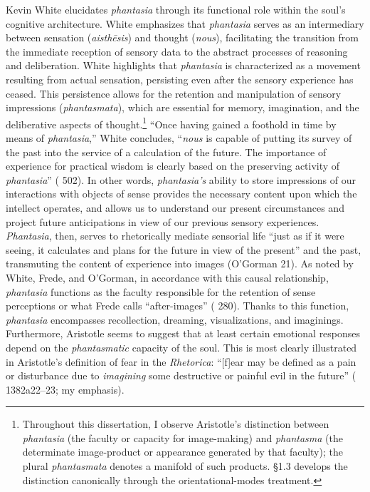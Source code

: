 Kevin White elucidates \textit{phantasia} through its functional role within the soul's cognitive architecture. White emphasizes that \textit{phantasia} serves as an intermediary between sensation (\textit{aisthēsis}) and thought (\textit{nous}), facilitating the transition from the immediate reception of sensory data to the abstract processes of reasoning and deliberation. White highlights that \textit{phantasia} is characterized as a movement resulting from actual sensation, persisting even after the sensory experience has ceased. This persistence allows for the retention and manipulation of sensory impressions (\textit{phantasmata}), which are essential for memory, imagination, and the deliberative aspects of thought.\footnote{Throughout this dissertation, I observe Aristotle's distinction between \textit{phantasia} (the faculty or capacity for image-making) and \textit{phantasma} (the determinate image-product or appearance generated by that faculty); the plural \textit{phantasmata} denotes a manifold of such products. \S1.3 develops the distinction canonically through the orientational-modes treatment.} ``Once having gained a foothold in time by means of \textit{phantasia},'' White concludes, ``\textit{nous} is capable of putting its survey of the past into the service of a calculation of the future. The importance of experience for practical wisdom is clearly based on the preserving activity of \textit{phantasia}'' (\cite{white1985meaning} 502). In other words, \textit{phantasia's} ability to store impressions of our interactions with objects of sense provides the necessary content upon which the intellect operates, and allows us to understand our present circumstances and project future anticipations in view of our previous sensory experiences. \textit{Phantasia}, then, serves to rhetorically mediate sensorial life ``just as if it were seeing, it calculates and plans for the future in view of the present'' and the past, transmuting the content of experience into images (O'Gorman 21). As noted by White, Frede, and O'Gorman, in accordance with this causal relationship, \textit{phantasia} functions as the faculty responsible for the retention of sense perceptions or what Frede calls ``after-images'' (\cite{frede1992cognitive} 280). Thanks to this function, \textit{phantasia} encompasses recollection, dreaming, visualizations, and imaginings. Furthermore, Aristotle seems to suggest that at least certain emotional responses depend on the \textit{phantasmatic} capacity of the soul. This is most clearly illustrated in Aristotle's definition of fear in the \textit{Rhetorica}: ``[f]ear may be defined as a pain or disturbance due to \textit{imagining} some destructive or painful evil in the future'' (\cite{aristotle_rhetoric} 1382a22--23; my emphasis).

